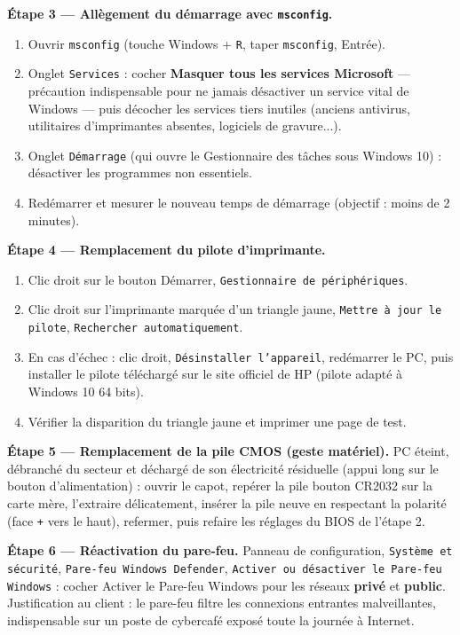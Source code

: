 \documentclass[11pt]{article}
\begin{document}
\begin{exoresolu}
\textbf{Étape 3 — Allègement du démarrage avec \texttt{msconfig}.}
\begin{enumerate}
\item Ouvrir \texttt{msconfig} (touche Windows + \texttt{R}, taper \texttt{msconfig}, Entrée).
\item Onglet \texttt{Services} : cocher \og \textbf{Masquer tous les services Microsoft} \fg{} — précaution indispensable pour ne jamais désactiver un service vital de Windows — puis décocher les services tiers inutiles (anciens antivirus, utilitaires d'imprimantes absentes, logiciels de gravure...).
\item Onglet \texttt{Démarrage} (qui ouvre le Gestionnaire des tâches sous Windows 10) : désactiver les programmes non essentiels.
\item Redémarrer et mesurer le nouveau temps de démarrage (objectif : moins de 2 minutes).
\end{enumerate}

\textbf{Étape 4 — Remplacement du pilote d'imprimante.}
\begin{enumerate}
\item Clic droit sur le bouton Démarrer, \texttt{Gestionnaire de périphériques}.
\item Clic droit sur l'imprimante marquée d'un triangle jaune, \texttt{Mettre à jour le pilote}, \texttt{Rechercher automatiquement}.
\item En cas d'échec : clic droit, \texttt{Désinstaller l'appareil}, redémarrer le PC, puis installer le pilote téléchargé sur le site officiel de HP (pilote adapté à Windows 10 64 bits).
\item Vérifier la disparition du triangle jaune et imprimer une page de test.
\end{enumerate}

\textbf{Étape 5 — Remplacement de la pile CMOS (geste matériel).} PC éteint, débranché du secteur et déchargé de son électricité résiduelle (appui long sur le bouton d'alimentation) : ouvrir le capot, repérer la pile bouton CR2032 sur la carte mère, l'extraire délicatement, insérer la pile neuve en respectant la polarité (face \texttt{+} vers le haut), refermer, puis refaire les réglages du BIOS de l'étape 2.

\textbf{Étape 6 — Réactivation du pare-feu.} Panneau de configuration, \texttt{Système et sécurité}, \texttt{Pare-feu Windows Defender}, \texttt{Activer ou désactiver le Pare-feu Windows} : cocher \og Activer le Pare-feu Windows \fg{} pour les réseaux \textbf{privé} et \textbf{public}. Justification au client : le pare-feu filtre les connexions entrantes malveillantes, indispensable sur un poste de cybercafé exposé toute la journée à Internet.


\end{exoresolu}
\end{document}
